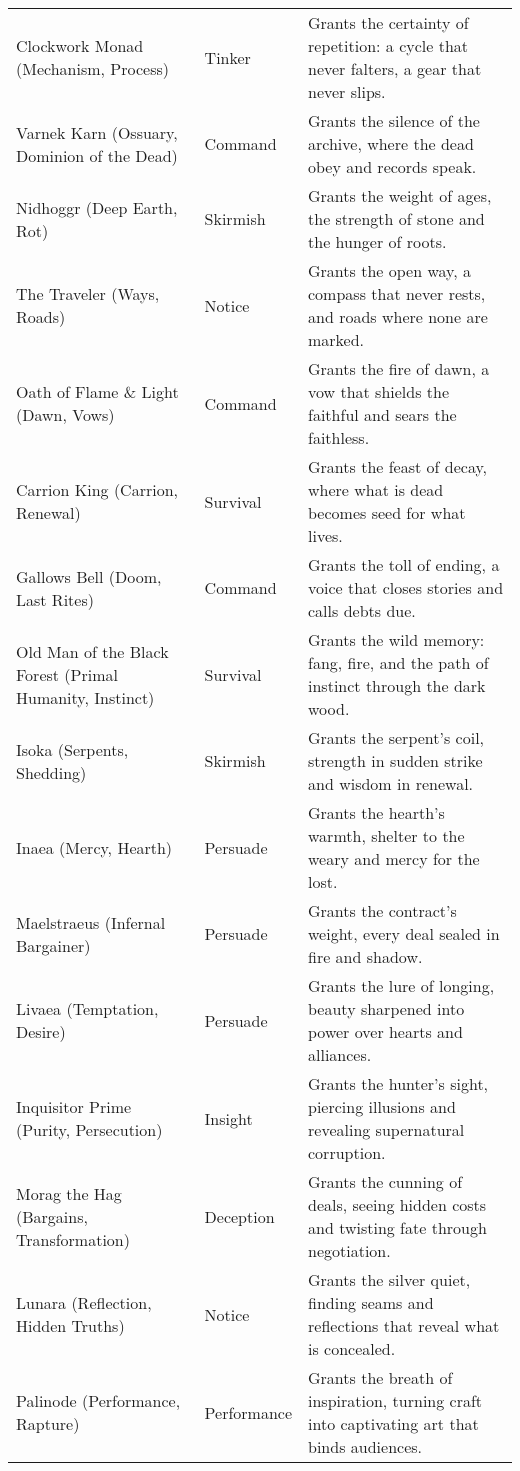 \begin{table}[H]
\begin{tabular}{@{}p{3.8cm}p{3.8cm}p{7.5cm}@{}}
  Clockwork Monad (Mechanism, Process) & Tinker & Grants the certainty of repetition: a cycle that never falters, a gear that never slips. \\
  Varnek Karn (Ossuary, Dominion of the Dead) & Command & Grants the silence of the archive, where the dead obey and records speak. \\
  Nidhoggr (Deep Earth, Rot) & Skirmish & Grants the weight of ages, the strength of stone and the hunger of roots. \\
  The Traveler (Ways, Roads) & Notice & Grants the open way, a compass that never rests, and roads where none are marked. \\
  Oath of Flame \& Light (Dawn, Vows) & Command & Grants the fire of dawn, a vow that shields the faithful and sears the faithless. \\
  Carrion King (Carrion, Renewal) & Survival & Grants the feast of decay, where what is dead becomes seed for what lives. \\
  Gallows Bell (Doom, Last Rites) & Command & Grants the toll of ending, a voice that closes stories and calls debts due. \\
  Old Man of the Black Forest (Primal Humanity, Instinct) & Survival & Grants the wild memory: fang, fire, and the path of instinct through the dark wood. \\
  Isoka (Serpents, Shedding) & Skirmish & Grants the serpent's coil, strength in sudden strike and wisdom in renewal. \\
  Inaea (Mercy, Hearth) & Persuade & Grants the hearth's warmth, shelter to the weary and mercy for the lost. \\
  Maelstraeus (Infernal Bargainer) & Persuade & Grants the contract's weight, every deal sealed in fire and shadow. \\
  Livaea (Temptation, Desire) & Persuade & Grants the lure of longing, beauty sharpened into power over hearts and alliances. \\
  Inquisitor Prime (Purity, Persecution) & Insight & Grants the hunter's sight, piercing illusions and revealing supernatural corruption. \\
  Morag the Hag (Bargains, Transformation) & Deception & Grants the cunning of deals, seeing hidden costs and twisting fate through negotiation. \\
  Lunara (Reflection, Hidden Truths) & Notice & Grants the silver quiet, finding seams and reflections that reveal what is concealed. \\
  Palinode (Performance, Rapture) & Performance & Grants the breath of inspiration, turning craft into captivating art that binds audiences. \\

\end{tabular}
\end{table}
